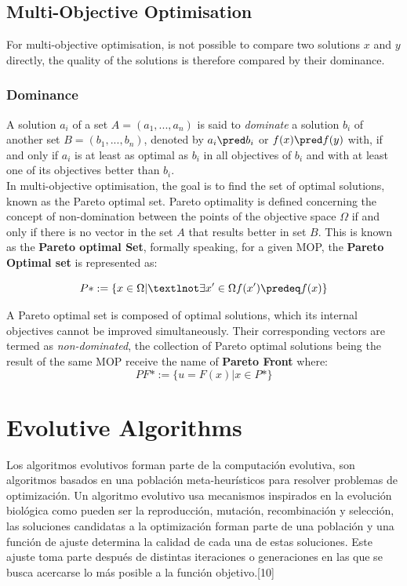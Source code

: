 \subsection{Multi-Objective Optimisation}

For multi-objective optimisation, is not possible to compare two solutions $x$ and $y$ directly, the quality of the solutions is therefore compared by their dominance.\\

\subsubsection{Dominance}

A solution $a_i$ of a set $A = (a_1,...,a_n)$ is said to \textit{dominate} a solution $b_i$ of another set $B = (b_1,...,b_n)$, denoted by $a_i \pred b_i$ or $f(x) \pred f(y)$ with, if and only if $a_i$ is at least as optimal as $b_i$ in all objectives of $b_i$ and with at least one of its objectives better than $b_i$.\\

In multi-objective optimisation, the goal is to find the set of optimal solutions, known as the Pareto optimal set. Pareto optimality is defined concerning the concept of non-domination between the points of the objective space $\Omega$ if and only if there is no vector in the set $A$ that results better in set $B$. This is known as the \textbf{Pareto optimal Set}, formally speaking, for a given MOP, the \textbf{Pareto Optimal set} is represented as:

\begin{equation}
    P* := \{x \in \Omega | ¬\exists x' \in \Omega f(x') \predeq f(x) \}
\end{equation}

A Pareto optimal set is composed of optimal solutions, which its internal objectives cannot be improved simultaneously. Their corresponding vectors are termed as \textit{non-dominated}, the collection of Pareto optimal solutions being the result of the same MOP receive the name of \textbf{Pareto Front} where:
\begin{equation}
    PF* := \{u= F(x) | x \in P*\}
\end{equation}


\section{Evolutive Algorithms}

Los algoritmos evolutivos forman parte de la computación evolutiva, son algoritmos basados en una población meta-heurísticos para resolver problemas de optimización. Un algoritmo evolutivo usa mecanismos inspirados en la evolución biológica como pueden ser la reproducción, mutación, recombinación y selección, las soluciones candidatas a la optimización forman parte de una población y una función de ajuste determina la calidad de cada una de estas soluciones. Este ajuste toma parte después de distintas iteraciones o generaciones en las que se busca acercarse lo más posible a la función objetivo.[10] \\

